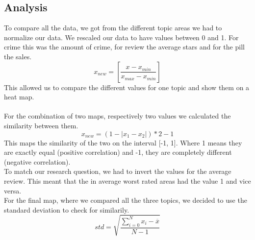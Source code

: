 \subsection*{Analysis}
To compare all the data, we got from the different topic areas we had to normalize our data. We rescaled our data to have values between 0 and 1. For crime this was the amount of crime, for review the average stars and for the pill the sales.
\[
x_{new}= 
\left[\frac{x-x_{min}}{x_{max}-x_{min}}\right]
\] 
This allowed us to compare the different values for one topic and show them on a heat map.\\\\
For the combination of two maps, respectively two values we calculated the similarity between them.
\[
x_{new}= 
(1-|x_{1}-x_{2}|) * 2 - 1
\] 
This maps the similarity of the two on the interval [-1, 1]. Where 1 means they are exactly equal (positive correlation) and -1, they are completely different (negative correlation).\\
To match our research question, we had to invert the values for the average review. This meant that the in average worst rated areas had the value 1 and vice versa.\\
For the final map, where we compared all the three topics, we decided to use the standard deviation to check for similarily.
\[
std= 
\sqrt{\frac{\sum_{i = 0}^{N}{x_{i} - \overline{x}}}{N-1}}
\]



